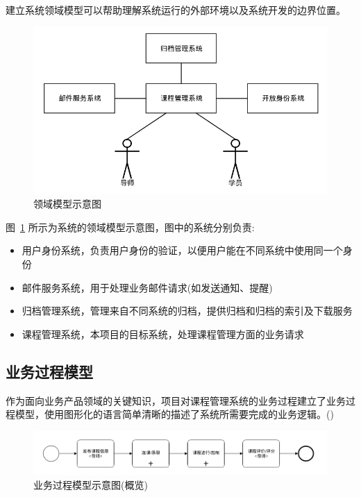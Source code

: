 建立系统领域模型可以帮助理解系统运行的外部环境以及系统开发的边界位置。

\begin{figure}[!hbp]
  \begin{center}
    \includegraphics[scale=0.5]{figures/diagram-domain-model.png}
    \caption{领域模型示意图\label{DomainModel}}
  \end{center}
\end{figure}

图~\ref{DomainModel} 所示为系统的领域模型示意图，图中的系统分别负责:

\begin{itemize}
\item 用户身份系统，负责用户身份的验证，以便用户能在不同系统中使用同一个身份
\item 邮件服务系统，用于处理业务邮件请求(如发送通知、提醒)
\item 归档管理系统，管理来自不同系统的归档，提供归档和归档的索引及下载服务
\item 课程管理系统，本项目的目标系统，处理课程管理方面的业务请求
\end{itemize}

\subsection{业务过程模型}

作为面向业务产品领域的关键知识，项目对课程管理系统的业务过程建立了业务过程模型，使用图形化的语言简单清晰的描述了系统所需要完成的业务逻辑。()

\begin{figure}[!hbp]
  \begin{center}
    \includegraphics[scale=0.5]{figures/diagram-bpm-overview.png}
    \caption{业务过程模型示意图(概览)\label{BPMOverview}}
  \end{center}
\end{figure}

